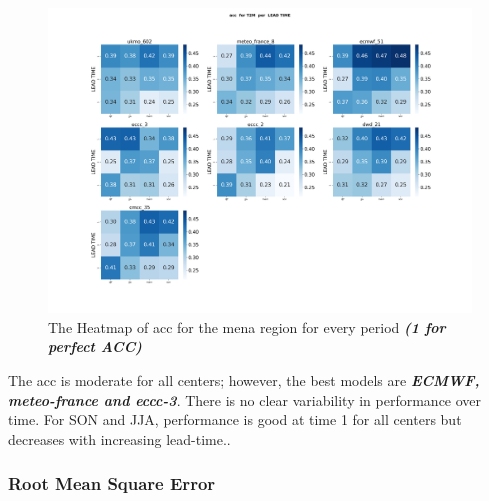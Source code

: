 \begin{figure}[H]
	\centering
	\includegraphics[scale=0.25]{plots/det/acc/acc_T2M_mena.png}
	\caption{The Heatmap of acc for the mena region for every period \textbf{\textit{(1 for perfect ACC)} }}
\end{figure}
The acc is moderate for all centers; however, the best models are \textbf{\textit{ECMWF, meteo-france and eccc-3}}. There is no clear variability in performance over time. For SON and JJA, performance is good at time 1 for all centers but decreases with increasing lead-time..



\subsubsection{Root Mean Square Error}


